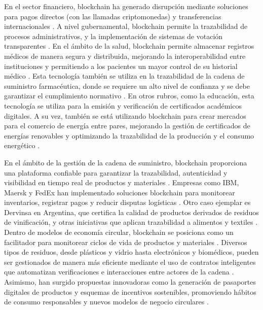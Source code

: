 
En el sector financiero, blockchain ha generado disrupción mediante soluciones para pagos directos (con las llamadas criptomonedas) y transferencias internacionales \cite{bartolomeo2020introduccion}. A nivel gubernamental, blockchain permite la trazabilidad de procesos administrativos, y la implementación de sistemas de votación transparentes \cite{vaigandla2023review}. En el ámbito de la salud, blockchain permite almacenar registros médicos de manera segura y distribuida, mejorando la interoperabilidad entre instituciones y permitiendo a los pacientes un mayor control de su historial médico \cite{sunny2022systematic}. Esta tecnología también se utiliza en la trazabilidad de la cadena de suministro farmacéutica, donde se requiere un alto nivel de confianza y se debe garantizar el cumplimiento normativo \cite{vaigandla2023review}. En otros rubros, como la educación, esta tecnología se utiliza para la emisión y verificación de certificados académicos digitales. A su vez, también se está utilizando blockchain para crear mercados para el comercio de energía entre pares, mejorando la gestión de certificados de energías renovables y optimizando la trazabilidad de la producción y el consumo energético \cite{sunny2022systematic, vaigandla2023review}.

En el ámbito de la gestión de la cadena de suministro, blockchain proporciona una plataforma confiable para garantizar la trazabilidad, autenticidad y visibilidad en tiempo real de productos y materiales \cite{torres2022tendencias, sharabati2024blockchain}. Empresas como IBM, Maersk y FedEx han implementado soluciones blockchain para monitorear inventarios, registrar pagos y reducir disputas logísticas \cite{tripathi2023comprehensive}. Otro caso ejemplar es Dervinsa en Argentina, que certifica la calidad de productos derivados de residuos de vinificación, y otras iniciativas que aplican trazabilidad a alimentos y textiles \cite{bartolomeo2020introduccion}. Dentro de modelos de economía circular, blockchain se posiciona como un facilitador para monitorear ciclos de vida de productos y materiales \cite{bulkowska2023implementation, baralla2023waste}. Diversos tipos de residuos, desde plásticos y vidrio hasta electrónicos y biomédicos, pueden ser gestionados de manera más eficiente mediante el uso de contratos inteligentes que automatizan verificaciones e interacciones entre actores de la cadena \cite{baralla2023waste}. Asimismo, han surgido propuestas innovadoras como la generación de pasaportes digitales de productos y esquemas de incentivos sostenibles, promoviendo hábitos de consumo responsables y nuevos modelos de negocio circulares \cite{baralla2023waste}.

